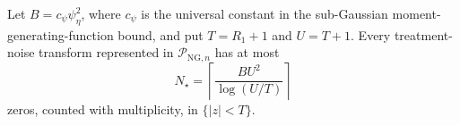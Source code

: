 Let \(B=c_{\psi}\psi_{\eta}^2\), where \(c_{\psi}\) is the universal constant in the sub-Gaussian moment-generating-function bound, and put \(T=R_1+1\) and \(U=T+1\).  Every treatment-noise transform represented in \(\mathcal P_{\mathrm{NG},n}\) has at most
\[
 N_{\star}=\left\lceil\frac{BU^2}{\log(U/T)}\right\rceil
\]
zeros, counted with multiplicity, in \(\{|z|<T\}\).